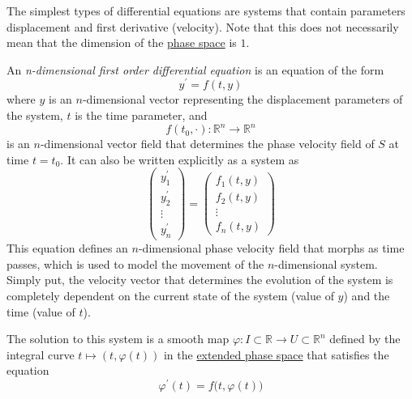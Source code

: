\documentclass{article}
\newcounter{definition}[section]
\begin{document}
    The simplest types of differential equations are systems that contain parameters displacement and first derivative (velocity). Note that this does not necessarily mean that the dimension of the \hyperref[def:phase-space]{phase space} is $1$. 

    \begin{definition}
      \label{def:n-dimensional-first-order-differential-equation}
    An \textit{n-dimensional first order differential equation} is an equation of the form
    \begin{equation}
      y^\prime = f(t, y)
    \end{equation}
    where $y$ is an $n$-dimensional vector representing the displacement parameters of the system, $t$ is the time parameter, and
    \begin{equation}
      f(t_0, \cdot) : \mathbb{R}^n \to \mathbb{R}^n
    \end{equation}
    is an $n$-dimensional vector field that determines the phase velocity field of $S$ at time $t = t_0$. It can also be written explicitly as a system as 
    \begin{equation}
      \begin{pmatrix}
          y_1^\prime \\ y_2^\prime \\ \vdots \\ y_n^\prime
          \end{pmatrix} = \begin{pmatrix}
          f_1 (t, y) \\ f_2 (t, y) \\ \vdots \\ f_n (t, y)
          \end{pmatrix}
    \end{equation}
    This equation defines an $n$-dimensional phase velocity field that morphs as time passes, which is used to model the movement of the $n$-dimensional system. Simply put, the velocity vector that determines the evolution of the system is completely dependent on the current state of the system (value of $y$) and the time (value of $t$). 

    The solution to this system is a smooth map $\varphi: I \subset \mathbb{R} \to U \subset \mathbb{R}^n$ defined by the integral curve $t \mapsto (t, \varphi(t))$ in the \hyperref[def:extended-phase-space]{extended phase space} that satisfies the equation
    \begin{equation}
      \varphi^\prime (t) = f\big( t, \varphi(t) \big)
    \end{equation}
    \end{definition}
\end{document}

